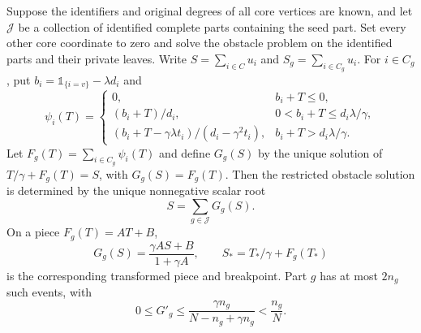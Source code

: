\begin{lemma}
\label{lem:op3-multipartite-scalar}
Suppose the identifiers and original degrees of all core vertices are
known, and let $\mathcal J$ be a collection of identified complete parts
containing the seed part. Set every other core coordinate to zero and
solve the obstacle problem on the identified parts and their private
leaves. Write $S=\sum_{i\in C}u_i$ and
$S_g=\sum_{i\in C_g}u_i$. For $i\in C_g$, put
$b_i=\mathbb 1_{\{i=v\}}-\lambda d_i$ and
\[
 \psi_i(T)=
 \begin{cases}
 0,&b_i+T\leq0,\\
 (b_i+T)/d_i,&0<b_i+T\leq d_i\lambda/\gamma,\\
 (b_i+T-\gamma\lambda t_i)/(d_i-\gamma^2t_i),
     &b_i+T>d_i\lambda/\gamma.
 \end{cases}
\]
Let $F_g(T)=\sum_{i\in C_g}\psi_i(T)$ and define $G_g(S)$ by the
unique solution of $T/\gamma+F_g(T)=S$, with $G_g(S)=F_g(T)$.
Then the restricted obstacle solution is determined by the unique
nonnegative scalar root
\begin{equation}
 S=\sum_{g\in\mathcal J}G_g(S).
 \label{eq:op3-multipartite-root}
\end{equation}
On a piece $F_g(T)=AT+B$,
\begin{equation}
 G_g(S)=\frac{\gamma AS+B}{1+\gamma A},\qquad
 S_* = T_*/\gamma+F_g(T_*)
 \label{eq:op3-part-transform}
\end{equation}
is the corresponding transformed piece and breakpoint. Part $g$ has at
most $2n_g$ such events, with
\begin{equation}
 0\leq G'_g\leq
 \frac{\gamma n_g}{N-n_g+\gamma n_g}<\frac{n_g}{N}.
 \label{eq:op3-part-slope}
\end{equation}
\end{lemma}
